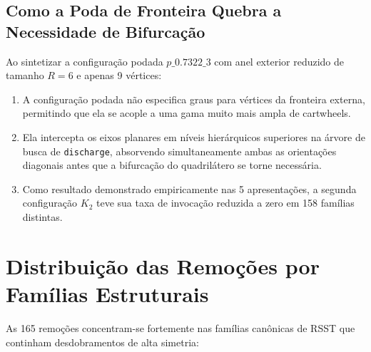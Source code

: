 \documentclass[11pt,a4paper]{article}
\begin{document}
\subsection{Como a Poda de Fronteira Quebra a Necessidade de Bifurcação}
Ao sintetizar a configuração podada $p\_0.7322\_3$ com anel exterior reduzido de tamanho $R=6$ e apenas 9 vértices:
\begin{enumerate}
    \item A configuração podada não especifica graus para vértices da fronteira externa, permitindo que ela se acople a uma gama muito mais ampla de cartwheels.
    \item Ela intercepta os eixos planares em níveis hierárquicos superiores na árvore de busca de \texttt{discharge}, absorvendo simultaneamente ambas as orientações diagonais antes que a bifurcação do quadrilátero se torne necessária.
    \item Como resultado demonstrado empiricamente nas 5 apresentações, a segunda configuração $K_2$ teve sua taxa de invocação reduzida a zero em 158 famílias distintas.
\end{enumerate}

\section{Distribuição das Remoções por Famílias Estruturais}

As 165 remoções concentram-se fortemente nas famílias canônicas de RSST que continham desdobramentos de alta simetria:
\end{document}
